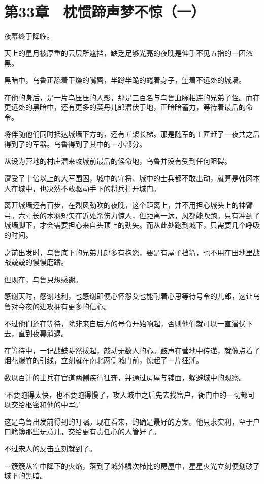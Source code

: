 \section{第33章　枕惯蹄声梦不惊（一）}

夜幕终于降临。

天上的星月被厚重的云层所遮挡，缺乏足够光亮的夜晚是伸手不见五指的一团浓黑。

黑暗中，乌鲁正舔着干燥的嘴唇，半蹲半跪的蜷着身子，望着不远处的城墙。

在他的身后，是一片乌压压的人影，那是三百名与乌鲁血脉相连的兄弟子侄。而在更远处的黑暗中，还有更多的契丹儿郎潜伏于地，正暗暗蓄力，等待着最后的命令。

将伴随他们同时抵达城墙下方的，还有五架长梯。那是随军的工匠赶了一夜共之后得到了的军器。乌鲁得到了其中的一小部分。

从设为营地的村庄潜来攻城前最后的候命地，乌鲁并没有受到任何阻碍。

遭受了十倍以上的大军围困，城中的守将、城中的士兵都不敢出动，就算是韩冈本人在城中，也决然不敢驱动手下的将兵打开城门。

离开城墙还有百步，在烈风劲吹的夜晚，这个距离上，并不用担心城头上的神臂弓。六寸长的木羽短矢在近处杀伤力惊人，但距离一远，风都能吹跑。只有冲到了城墙脚下，才会需要担心来自头顶上的劲矢。而从此处跑到城下，只需要几个呼吸的时间。

之前出发时，乌鲁底下的兄弟儿郎多有抱怨，要是有屋子挡箭，也不用在田地里战战兢兢的慢慢磨蹭。

但现在，乌鲁只想感谢。

感谢天时，感谢地利，也感谢即便心怀怨艾也能耐着心思等待号令的儿郎，这让乌鲁对今夜的进攻拥有更多的信心。

不过他们还在等待，除非来自后方的号令开始响起，否则他们就可以一直潜伏下去，直到夜幕消退。

在等待中，一记战鼓陡然拔起，敲动无数人的心。鼓声在营地中传递，就像点着了烟花爆竹的引线，立刻就在南北两侧城门前，惊起了一片狂潮。

数以百计的士兵在官道两侧疾行狂奔，并通过房屋与铺面，躲避城中的观察。

‘不要跑得太快，也不要跑得慢了，攻入城中之后先去找富户，衙门中的一切都可以交给枢密和他的中军。’

这是乌鲁出发前得到的叮嘱。现在看来，的确是最好的方案。他只求实利，至于户口籍簿那些玩意儿，交给更有责任心的人管好了。

不过宋人的反击立刻就到了。

一簇簇从空中降下的火焰，落到了城外鳞次栉比的房屋中，星星火光立刻便划破了城下的黑暗。


